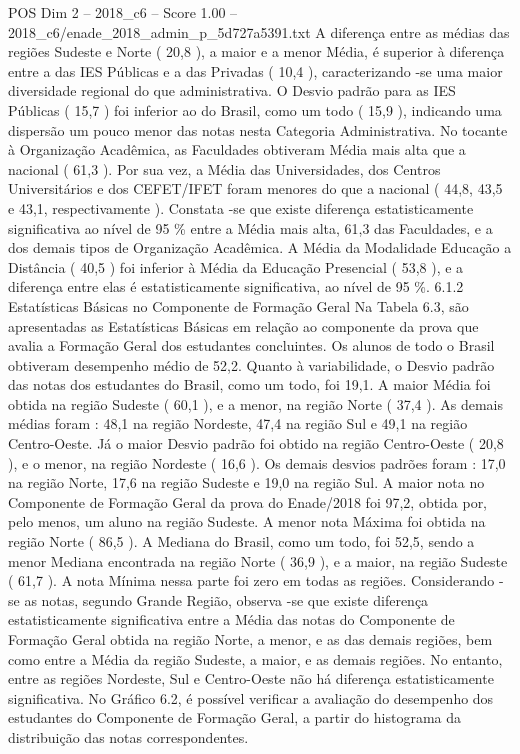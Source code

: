 \begin{textsample}{POS Dim 2 – 2018\_c6 – Score 1.00 – 2018\_c6/enade\_2018\_admin\_p\_5d727a5391.txt}
A diferença entre as médias das regiões Sudeste e Norte ( 20,8 ), a maior e a menor Média, é superior à diferença entre a das IES Públicas e a das Privadas ( 10,4 ), caracterizando -se uma maior diversidade regional do que administrativa.
O Desvio padrão para as IES Públicas ( 15,7 ) foi inferior ao do Brasil, como um todo ( 15,9 ), indicando uma dispersão um pouco menor das notas nesta Categoria Administrativa.
No tocante à Organização Acadêmica, as Faculdades obtiveram Média mais alta que a nacional ( 61,3 ).
Por sua vez, a Média das Universidades, dos Centros Universitários e dos CEFET/IFET foram menores do que a nacional ( 44,8, 43,5 e 43,1, respectivamente ).
Constata -se que existe diferença estatisticamente significativa ao nível de 95 \% entre a Média mais alta, 61,3 das Faculdades, e a dos demais tipos de Organização Acadêmica.
A Média da Modalidade Educação a Distância ( 40,5 ) foi inferior à Média da Educação Presencial ( 53,8 ), e a diferença entre elas é estatisticamente significativa, ao nível de 95 \%. 6.1.2 Estatísticas Básicas no Componente de Formação Geral Na Tabela 6.3, são apresentadas as Estatísticas Básicas em relação ao componente da prova que avalia a Formação Geral dos estudantes concluintes.
Os alunos de todo o Brasil obtiveram desempenho médio de 52,2.
Quanto à variabilidade, o Desvio padrão das notas dos estudantes do Brasil, como um todo, foi 19,1.
A maior Média foi obtida na região Sudeste ( 60,1 ), e a menor, na região Norte ( 37,4 ).
As demais médias foram : 48,1 na região Nordeste, 47,4 na região Sul e 49,1 na região Centro-Oeste.
Já o maior Desvio padrão foi obtido na região Centro-Oeste ( 20,8 ), e o menor, na região Nordeste ( 16,6 ).
Os demais desvios padrões foram : 17,0 na região Norte, 17,6 na região Sudeste e 19,0 na região Sul.
A maior nota no Componente de Formação Geral da prova do Enade/2018 foi 97,2, obtida por, pelo menos, um aluno na região Sudeste.
A menor nota Máxima foi obtida na região Norte ( 86,5 ).
A Mediana do Brasil, como um todo, foi 52,5, sendo a menor Mediana encontrada na região Norte ( 36,9 ), e a maior, na região Sudeste ( 61,7 ).
A nota Mínima nessa parte foi zero em todas as regiões.
Considerando -se as notas, segundo Grande Região, observa -se que existe diferença estatisticamente significativa entre a Média das notas do Componente de Formação Geral obtida na região Norte, a menor, e as das demais regiões, bem como entre a Média da região Sudeste, a maior, e as demais regiões.
No entanto, entre as regiões Nordeste, Sul e Centro-Oeste não há diferença estatisticamente significativa.
No Gráfico 6.2, é possível verificar a avaliação do desempenho dos estudantes do Componente de Formação Geral, a partir do histograma da distribuição das notas correspondentes.

\end{textsample}
